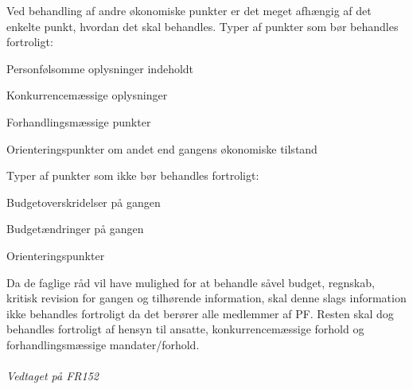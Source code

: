 Ved behandling af andre økonomiske punkter er det meget afhængig af det enkelte punkt, hvordan det skal behandles.
Typer af punkter som bør behandles fortroligt:
\begin{list}{•}
\item Personfølsomme oplysninger indeholdt
\item Konkurrencemæssige oplysninger
\item Forhandlingsmæssige punkter
\item Orienteringspunkter om andet end gangens økonomiske tilstand
\end{list}
Typer af punkter som ikke bør behandles fortroligt:
\begin{list}{•}
\item Budgetoverskridelser på gangen
\item Budgetændringer på gangen
\item Orienteringspunkter
\end{list}
Da de faglige råd vil have mulighed for at behandle såvel budget, regnskab, kritisk revision for gangen og tilhørende
information, skal denne slags information ikke behandles fortroligt da det berører alle medlemmer af PF.
Resten skal dog behandles fortroligt af hensyn til ansatte, konkurrencemæssige forhold og forhandlingsmæssige
mandater/forhold.
\\
\\

\textit{Vedtaget på FR152}
